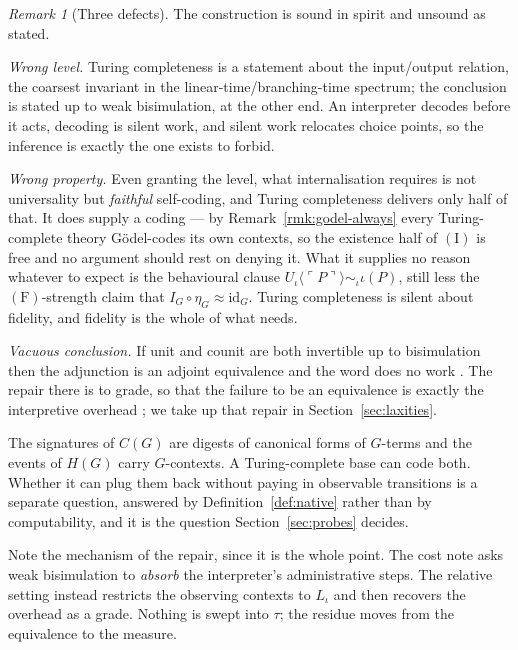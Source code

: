 \documentclass[11pt,a4paper]{article}
\theoremstyle{definition}
\theoremstyle{plain}
\theoremstyle{remark}
\newtheorem{remark}[definition]{Remark}
\newcommand{\id}{\mathrm{id}}
\newcommand{\Fcond}{(\mathrm{F})}
\newcommand{\Icond}{(\mathrm{I})}
\begin{document}
\begin{remark}[Three defects]
\label{rmk:defects}
The construction is sound in spirit and unsound as stated.

\emph{Wrong level.} Turing completeness is a statement about the input/output relation, the coarsest
invariant in the linear-time/branching-time spectrum; the conclusion is stated up to weak
bisimulation, at the other end. An interpreter decodes before it acts, decoding is silent work, and
silent work relocates choice points, so the inference is exactly the one \cite{probe} exists to
forbid.

\emph{Wrong property.} Even granting the level, what internalisation requires is not universality
but \emph{faithful} self-coding, and Turing completeness delivers only half of that. It does supply a
coding --- by Remark~\ref{rmk:godel-always} every Turing-complete theory Gödel-codes its own
contexts, so the existence half of $\Icond$ is free and no argument should rest on denying it. What
it supplies no reason whatever to expect is the behavioural clause
$U_\iota\langle \ulcorner P \urcorner \rangle \sim_\iota \iota(P)$, still less the $\Fcond$-strength
claim that $I_G \circ \eta_G \approx \id_G$. Turing completeness is silent about fidelity, and
fidelity is the whole of what \cite[Prop.~9.5]{cost} needs.

\emph{Vacuous conclusion.} If unit and counit are both invertible up to bisimulation then the
adjunction is an adjoint equivalence and the word does no work \cite[Rmk.~6.6]{probe}. The repair
there is to grade, so that the failure to be an equivalence is exactly the interpretive overhead
\cite[Cor.~6.9]{probe}; we take up that repair in Section~\ref{sec:laxities}.
\end{remark}

The signatures of $C(G)$ are digests of canonical forms of $G$-terms and the events of $H(G)$ carry
$G$-contexts. A Turing-complete base can code both. Whether it can plug them back without paying in
observable transitions is a separate question, answered by Definition~\ref{def:native} rather than by
computability, and it is the question Section~\ref{sec:probes} decides.

Note the mechanism of the repair, since it is the whole point. The cost note asks weak bisimulation
to \emph{absorb} the interpreter's administrative steps. The relative setting instead restricts the
observing contexts to $L_\iota$ and then recovers the overhead as a grade. Nothing is swept into
$\tau$; the residue moves from the equivalence to the measure.
\end{document}
